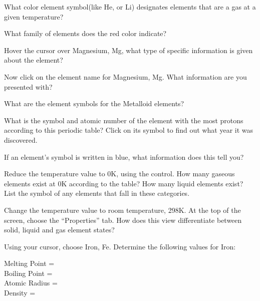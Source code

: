 \documentclass[12pt,answers]{exam}
\begin{document}
    
\begin{questions}

\question What color element symbol(like He, or Li) designates elements that are a gas at a given temperature? \fillin[red][1cm]

\question  What family of elements does the red color indicate? 

\question Hover the cursor over Magnesium, Mg, what type of specific information is given about the element?\\ 

\question  Now click on the element name for Magnesium, Mg. What information are you presented with?


\question What are the element symbols for the Metalloid elements?\\

\fillin[B, Si, Ge, As, Sb, Te, At ][6cm]

\question What is the symbol and atomic number of the element with the most protons according to this periodic table? Click on its symbol to find out what year it was discovered.\\


\question If an element's symbol is written in blue, what information does this tell you?\\


\question Reduce the temperature value to 0K, using the control. How many gaseous elements exist at 0K according to the table? How many liquid elements exist? List the symbol of any elements that fall in these categories.


\question Change the temperature value to room temperature, 298K. At the top of the
screen, choose the “Properties” tab. How does this view differentiate between solid,
liquid and gas element states?

\question Using your cursor, choose Iron, Fe. Determine the following values for Iron:

 Melting Point = \fillin[$8111K$][3cm]\\
 Boiling Point = \fillin[$3134K$][3cm]\\
 Atomic Radius = \fillin[$156pm$][3cm]\\
 Density = \fillin[$7874 kg/m^3$][3cm]\\

\end{questions}
\end{document}

